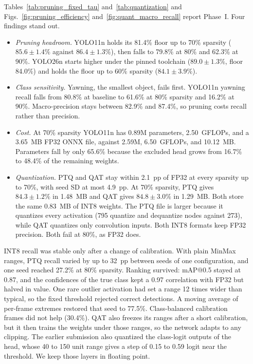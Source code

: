 \documentclass[conference]{IEEEtran}
\begin{document}
Tables~\ref{tab:pruning_fixed_tau} and~\ref{tab:quantization} and Figs.~\ref{fig:pruning_efficiency} and~\ref{fig:quant_macro_recall} report Phase~I. Four findings stand out.
\begin{itemize}
\item \emph{Pruning headroom.} YOLO11n holds its 81.4\% floor up to 70\% sparsity ($85.6\pm1.4\%$ against $86.4\pm1.3\%$), then falls to 79.8\% at 80\% and 62.3\% at 90\%. YOLO26n starts higher under the pinned toolchain ($89.0\pm1.3\%$, floor 84.0\%) and holds the floor up to 60\% sparsity ($84.1\pm3.9\%$).
\item \emph{Class sensitivity.} Yawning, the smallest object, fails first. YOLO11n yawning recall falls from 80.8\% at baseline to 61.6\% at 80\% sparsity and 16.2\% at 90\%. Macro-precision stays between 82.9\% and 87.4\%, so pruning costs recall rather than precision.
\item \emph{Cost.} At 70\% sparsity YOLO11n has 0.89M parameters, 2.50~GFLOPs, and a 3.65~MB FP32 ONNX file, against 2.59M, 6.50~GFLOPs, and 10.12~MB. Parameters fall by only 65.6\% because the excluded head grows from 16.7\% to 48.4\% of the remaining weights.
\item \emph{Quantization.} PTQ and QAT stay within 2.1~pp of FP32 at every sparsity up to 70\%, with seed SD at most 4.9~pp. At 70\% sparsity, PTQ gives $84.3\pm1.2\%$ in 1.48~MB and QAT gives $84.8\pm3.0\%$ in 1.29~MB. Both store the same 0.83~MB of INT8 weights. The PTQ file is larger because it quantizes every activation (795 quantize and dequantize nodes against 273), while QAT quantizes only convolution inputs. Both INT8 formats keep FP32 precision. Both fail at 80\%, as FP32 does.
\end{itemize}
INT8 recall was stable only after a change of calibration. With plain MinMax ranges, PTQ recall varied by up to 32~pp between seeds of one configuration, and one seed reached 27.2\% at 80\% sparsity. Ranking survived: mAP@0.5 stayed at 0.87, and the confidences of the true class kept a 0.97 correlation with FP32 but halved in value. One rare outlier activation had set a range 12 times wider than typical, so the fixed threshold rejected correct detections. A moving average of per-frame extremes restored that seed to 77.5\%. Class-balanced calibration frames did not help (30.4\%). QAT also freezes its ranges after a short calibration, but it then trains the weights under those ranges, so the network adapts to any clipping. The earlier submission also quantized the class-logit outputs of the head, whose 40 to 150 unit range gives a step of 0.15 to 0.59 logit near the threshold. We keep those layers in floating point.
\end{document}
